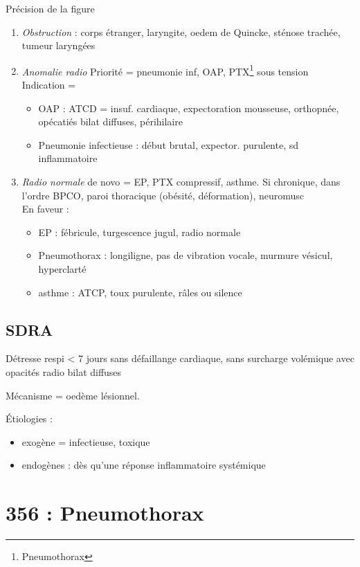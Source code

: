 Précision de la figure~
\begin{enumerate}
  \item \textit{Obstruction}  : corps étranger, laryngite, oedem de Quincke, sténose
    trachée, tumeur laryngées
  \item \textit{Anomalie radio} Priorité = pneumonie inf, OAP,
    PTX\footnote{Pneumothorax} sous
    tension\\
    Indication =
    \begin{itemize}
    \item OAP : {ATCD = insuf. cardiaque}, {expectoration mousseuse, orthopnée},
      {opécatiés bilat diffuses, périhilaire}
    \item Pneumonie infectieuse : {début brutal}, {expector. purulente}, {sd
      inflammatoire}
    \end{itemize}
  \item \textit{Radio normale} de novo = EP, PTX compressif, asthme. Si
    chronique, dans l'ordre BPCO, paroi thoracique (obésité, déformation),
    neuromusc\\
    En faveur :
    \begin{itemize}
      \item EP : fébricule, turgescence jugul, radio normale
      \item Pneumothorax : {longiligne}, {pas de vibration vocale}, murmure vésicul,
        {hyperclarté}
      \item asthme : ATCP, {toux purulente}, {râles ou silence}
    \end{itemize}
\end{enumerate}

\subsection{SDRA}
Détresse respi < 7 jours sans défaillange cardiaque, sans surcharge volémique
avec opacités radio bilat diffuses

Mécanisme = oedème lésionnel.

Étiologies :
\begin{itemize}
  \item exogène = infectieuse, toxique
  \item endogènes : dès qu'une réponse inflammatoire systémique
\end{itemize}

\section{356 : Pneumothorax}%

